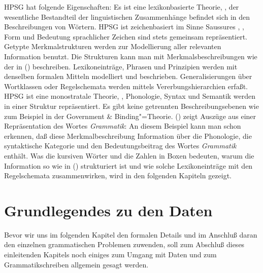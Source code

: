 HPSG hat folgende Eigenschaften: Es ist eine lexikonbasierte Theorie,
\dash, der wesentliche Bestandteil der linguistischen Zusammenhänge
befindet sich in den Beschreibungen von Wörtern. HPSG ist zeichenbasiert
im Sinne Saussures \citeyearpar{Saussure16a-de}, \dash, Form und Bedeutung
sprachlicher Zeichen sind stets gemeinsam repräsentiert. Getypte
Merkmalstrukturen werden zur Modellierung
aller relevanten Information benutzt. Die Strukturen kann man mit Merkmalsbeschreibungen wie der in
() beschreiben. Lexikoneinträge, Phrasen
und Prinzipien werden mit denselben formalen Mitteln modelliert und beschrieben.
Generalisierungen über Wortklassen oder Regelschemata werden
mittels Vererbungshierarchien erfaßt.
HPSG ist eine monostratale Theorie, \dash, Phonologie, Syntax
und Semantik werden in einer Struktur repräsentiert. Es gibt keine
getrennten Beschreibungsebenen wie zum Beispiel in der Government \& Binding"=Theorie.
() zeigt Auszüge aus einer Repräsentation des Wortes \emph{Grammatik}:
\ea
{}
\z
An diesem Beispiel kann man schon erkennen, daß diese Merkmalbeschreibung
Information über die Phonologie, die syntaktische Kategorie und den Bedeutungsbeitrag
des Wortes \emph{Grammatik} enthält. Was die kursiven Wörter und die Zahlen in Boxen
bedeuten, warum die Information so wie in () strukturiert ist und wie solche Lexikoneinträge
mit den Regelschemata zusammenwirken, wird in den folgenden Kapiteln gezeigt.

\section{Grundlegendes zu den Daten}
\label{sec-grundlegendes-zu-daten}

Bevor wir uns im folgenden Kapitel den formalen Details und im Anschluß daran den einzelnen
grammatischen Problemen zuwenden, soll zum Abschluß dieses einleitenden Kapitels noch einiges zum
Umgang mit Daten und zum Grammatikschreiben allgemein gesagt werden.

